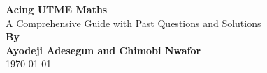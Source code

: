 \documentclass[a4paper]{book}
\begin{document}
\begin{titlingpage}
\centering
\vspace*{\fill}
\Huge\textbf{Acing UTME Maths}\\
\vspace{1cm}
\Large{A Comprehensive Guide with Past Questions and Solutions}\\
\vspace{2cm}
\Large\textbf{By}\\
\vspace{0.5cm}
\Large\textbf{Ayodeji Adesegun and Chimobi Nwafor}\\
\vspace*{\fill}
\Large{\today}\\
\vspace*{\fill}
\end{titlingpage}
\end{document}
